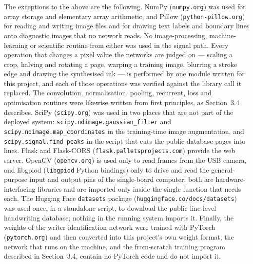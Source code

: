 The exceptions to the above are the following. NumPy (\texttt{numpy.org}) was used for array
storage and elementary array arithmetic, and Pillow (\texttt{python-pillow.org}) for reading and
writing image files and for drawing text labels and boundary lines onto diagnostic images that no
network reads. No image-processing, machine-learning or scientific routine from either was used in
the signal path. Every operation that changes a pixel value the networks are judged on --- scaling
a crop, halving and rotating a page, warping a training image, blurring a stroke edge and drawing
the synthesised ink --- is performed by one module written for this project, and each of those
operations was verified against the library call it replaced. The convolution, normalisation,
pooling, recurrent, loss and optimisation routines were likewise written from first principles, as
Section~3.4 describes. SciPy
(\texttt{scipy.org}) was used in two places that are not part of the deployed system:
\texttt{scipy.ndimage.gaussian\_filter} and \texttt{scipy.ndimage.map\_coordinates} in the
training-time image augmentation, and \texttt{scipy.signal.find\_peaks} in the script that cuts the
public database pages into lines. Flask and Flask-CORS (\texttt{flask.palletsprojects.com}) provide
the web server. OpenCV (\texttt{opencv.org}) is used only to read frames from the USB camera, and
libgpiod (\texttt{libgpiod} Python bindings) only to drive and read the general-purpose input and
output pins of the single-board computer; both are hardware-interfacing libraries and are imported
only inside the single function that needs each. The Hugging Face \texttt{datasets} package
(\texttt{huggingface.co/docs/datasets}) was used once, in a standalone script, to download the
public line-level handwriting database; nothing in the running system imports it. Finally, the
weights of the writer-identification network were trained with PyTorch (\texttt{pytorch.org}) and
then converted into this project's own weight format; the network that runs on the machine, and the
from-scratch training program described in Section~3.4, contain no PyTorch code and do not import
it.


